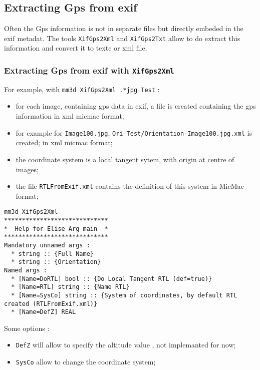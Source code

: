 \subsection{Extracting Gps from exif}

Often the Gps information is not in separate files but directly embeded in the exif
metadat. The tools {\tt XifGps2Xml} and {\tt XifGps2Txt} allow to do extract this 
information and convert it to texte or xml file.

\subsubsection{Extracting Gps from exif with {\tt XifGps2Xml}}


For example, with {\tt mm3d XifGps2Xml .*jpg Test}  :

\begin{itemize}
  \item for each  image,  containing gps data in exif, a file is created containing the gps information
        in xml micmac format;
  \item for example for {\tt Image100.jpg},  {\tt Ori-Test/Orientation-Image100.jpg.xml} is created; 
        in xml micmac format;
  \item the coordinate system is a local tangent sytem, with origin at centre of images;
  \item  the file {\tt RTLFromExif.xml} contains the definition of this system in MicMac format;
\end{itemize}

\begin{verbatim}
mm3d XifGps2Xml
*****************************
*  Help for Elise Arg main  *
*****************************
Mandatory unnamed args : 
  * string :: {Full Name}
  * string :: {Orientation}
Named args : 
  * [Name=DoRTL] bool :: {Do Local Tangent RTL (def=true)}
  * [Name=RTL] string :: {Name RTL}
  * [Name=SysCo] string :: {System of coordinates, by default RTL created (RTLFromExif.xml)}
  * [Name=DefZ] REAL
\end{verbatim}

Some options :

\begin{itemize}
   \item {\tt DefZ} will allow to specify the altitude value , not implemanted for now;

   \item {\tt SysCo}  allow to change the coordinate system;

\end{itemize}

